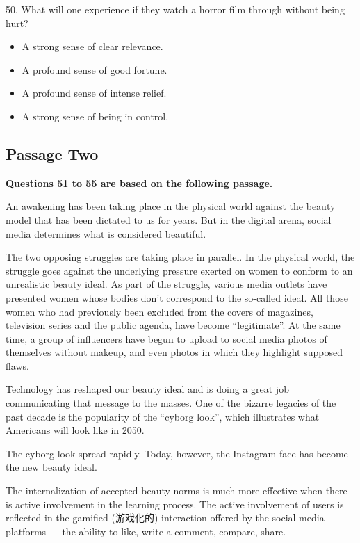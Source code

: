 \documentclass[UTF8,11pt]{ctexart}
\begin{document}
50. What will one experience if they watch a horror film through without being hurt?


\begin{itemize}[leftmargin=2em,itemsep=.2em,topsep=.4em]\item[A.] A strong sense of clear relevance.
\item[B.] A profound sense of good fortune.
\item[C.] A profound sense of intense relief.
\item[D.] A strong sense of being in control.
\end{itemize}

\subsection*{\textbf{Passage Two}}


\textbf{Questions 51 to 55 are based on the following passage.}


An awakening has been taking place in the physical world against the beauty model that has been dictated to us for years. But in the digital arena, social media determines what is considered beautiful.


The two opposing struggles are taking place in parallel. In the physical world, the struggle goes against the underlying pressure exerted on women to conform to an unrealistic beauty ideal. As part of the struggle, various media outlets have presented women whose bodies don’t correspond to the so-called ideal. All those women who had previously been excluded from the covers of magazines, television series and the public agenda, have become “legitimate”. At the same time, a group of influencers have begun to upload to social media photos of themselves without makeup, and even photos in which they highlight supposed flaws.


Technology has reshaped our beauty ideal and is doing a great job communicating that message to the masses. One of the bizarre legacies of the past decade is the popularity of the “cyborg look”, which illustrates what Americans will look like in 2050.


The cyborg look spread rapidly. Today, however, the Instagram face has become the new beauty ideal.


The internalization of accepted beauty norms is much more effective when there is active involvement in the learning process. The active involvement of users is reflected in the gamified (游戏化的) interaction offered by the social media platforms — the ability to like, write a comment, compare, share.
\end{document}
